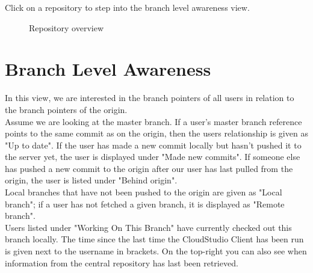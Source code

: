 Click on a repository to step into the branch level awareness view.



\begin{figure}[h!]
  \centering
  \caption{Repository overview}
  \label{fig:overview}
\end{figure}





\section{Branch Level Awareness}

In this view, we are interested in the branch pointers of all users in relation to the branch pointers of the origin. \\

Assume we are looking at the master branch. If a user's master branch reference points to the same commit as on the origin, then the users relationship is given as "Up to date". If the user has made a new commit locally but hasn't pushed it to the server yet, the user is displayed under "Made new commits". If someone else has pushed a new commit to the origin after our user has last pulled from the origin, the user is listed under "Behind origin". \\

Local branches that have not been pushed to the origin are given as "Local branch"; if a user has not fetched a given branch, it is displayed as "Remote branch". \\

Users listed under "Working On This Branch" have currently checked out this branch locally. The time since the last time the CloudStudio Client has been run is given next to the username in brackets. On the top-right you can also see when information from the central repository has last been retrieved. \\

